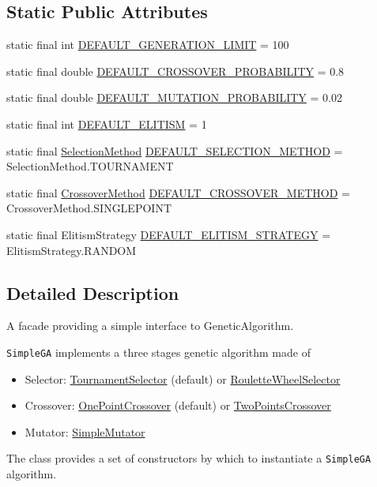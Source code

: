 \subsection*{Static Public Attributes}
\begin{CompactItemize}
\item 
static final int \hyperlink{classjenes_1_1algorithms_1_1_simple_g_a_3_01_t_01extends_01_chromosome_01_4_c4060f400a4a9d81185713c244699d40}{DEFAULT\_\-GENERATION\_\-LIMIT} = 100
\item 
static final double \hyperlink{classjenes_1_1algorithms_1_1_simple_g_a_3_01_t_01extends_01_chromosome_01_4_6bb4783aa44abaae39375ae762412fa3}{DEFAULT\_\-CROSSOVER\_\-PROBABILITY} = 0.8
\item 
static final double \hyperlink{classjenes_1_1algorithms_1_1_simple_g_a_3_01_t_01extends_01_chromosome_01_4_6b93f23c518016295e31b02aa7ef1f8c}{DEFAULT\_\-MUTATION\_\-PROBABILITY} = 0.02
\item 
static final int \hyperlink{classjenes_1_1algorithms_1_1_simple_g_a_3_01_t_01extends_01_chromosome_01_4_3b820957538efb558e8240e996d503cd}{DEFAULT\_\-ELITISM} = 1
\item 
static final \hyperlink{classjenes_1_1algorithms_1_1_simple_g_a_3_01_t_01extends_01_chromosome_01_4_6310e8ba52593a9b9ab7809caa9ba296}{SelectionMethod} \hyperlink{classjenes_1_1algorithms_1_1_simple_g_a_3_01_t_01extends_01_chromosome_01_4_93d44174d00fdf0a8ebedfa3badcde66}{DEFAULT\_\-SELECTION\_\-METHOD} = SelectionMethod.TOURNAMENT
\item 
static final \hyperlink{classjenes_1_1algorithms_1_1_simple_g_a_3_01_t_01extends_01_chromosome_01_4_d015c6a036c7234fe34a1a78fc3c55bf}{CrossoverMethod} \hyperlink{classjenes_1_1algorithms_1_1_simple_g_a_3_01_t_01extends_01_chromosome_01_4_568bc71d97e1221ff4c7a4cc2b9a938d}{DEFAULT\_\-CROSSOVER\_\-METHOD} = CrossoverMethod.SINGLEPOINT
\item 
static final ElitismStrategy \hyperlink{classjenes_1_1algorithms_1_1_simple_g_a_3_01_t_01extends_01_chromosome_01_4_b95f26a5f33145a73eed2832becb962f}{DEFAULT\_\-ELITISM\_\-STRATEGY} = ElitismStrategy.RANDOM
\end{CompactItemize}


\subsection{Detailed Description}
A facade providing a simple interface to GeneticAlgorithm. 

{\tt SimpleGA} implements a three stages genetic algorithm made of \begin{itemize}
\item Selector: \hyperlink{}{TournamentSelector} (default) or \hyperlink{}{RouletteWheelSelector} \item Crossover: \hyperlink{}{OnePointCrossover} (default) or \hyperlink{}{TwoPointsCrossover} \item Mutator: \hyperlink{}{SimpleMutator} \end{itemize}
The class provides a set of constructors by which to instantiate a {\tt SimpleGA} algorithm. 

